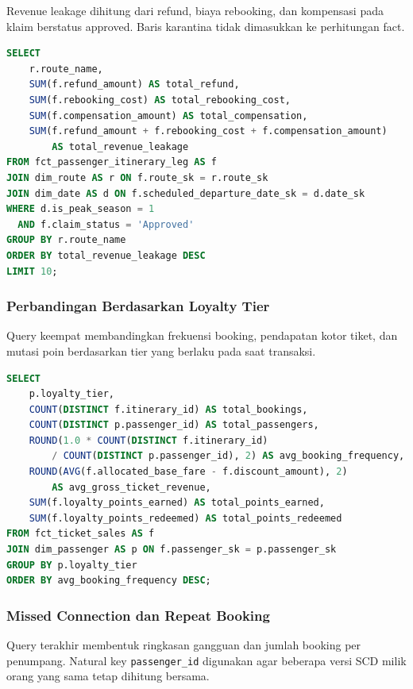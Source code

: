 Revenue leakage dihitung dari refund, biaya rebooking, dan kompensasi pada klaim
berstatus approved. Baris karantina tidak dimasukkan ke perhitungan fact.

\begin{lstlisting}[language=SQL]
SELECT
    r.route_name,
    SUM(f.refund_amount) AS total_refund,
    SUM(f.rebooking_cost) AS total_rebooking_cost,
    SUM(f.compensation_amount) AS total_compensation,
    SUM(f.refund_amount + f.rebooking_cost + f.compensation_amount)
        AS total_revenue_leakage
FROM fct_passenger_itinerary_leg AS f
JOIN dim_route AS r ON f.route_sk = r.route_sk
JOIN dim_date AS d ON f.scheduled_departure_date_sk = d.date_sk
WHERE d.is_peak_season = 1
  AND f.claim_status = 'Approved'
GROUP BY r.route_name
ORDER BY total_revenue_leakage DESC
LIMIT 10;
\end{lstlisting}

\subsubsection{Perbandingan Berdasarkan Loyalty Tier}

Query keempat membandingkan frekuensi booking, pendapatan kotor tiket, dan mutasi
poin berdasarkan tier yang berlaku pada saat transaksi.

\begin{lstlisting}[language=SQL]
SELECT
    p.loyalty_tier,
    COUNT(DISTINCT f.itinerary_id) AS total_bookings,
    COUNT(DISTINCT p.passenger_id) AS total_passengers,
    ROUND(1.0 * COUNT(DISTINCT f.itinerary_id)
        / COUNT(DISTINCT p.passenger_id), 2) AS avg_booking_frequency,
    ROUND(AVG(f.allocated_base_fare - f.discount_amount), 2)
        AS avg_gross_ticket_revenue,
    SUM(f.loyalty_points_earned) AS total_points_earned,
    SUM(f.loyalty_points_redeemed) AS total_points_redeemed
FROM fct_ticket_sales AS f
JOIN dim_passenger AS p ON f.passenger_sk = p.passenger_sk
GROUP BY p.loyalty_tier
ORDER BY avg_booking_frequency DESC;
\end{lstlisting}

\subsubsection{Missed Connection dan Repeat Booking}

Query terakhir membentuk ringkasan gangguan dan jumlah booking per penumpang.
Natural key \texttt{passenger\_id} digunakan agar beberapa versi SCD milik orang
yang sama tetap dihitung bersama.

